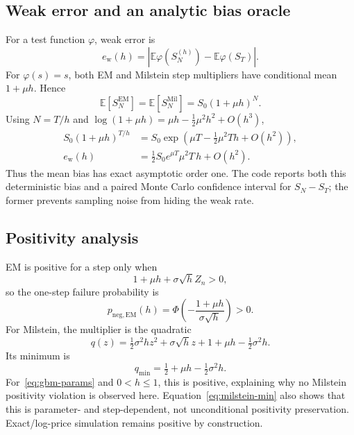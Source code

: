 \documentclass[11pt,a4paper]{article}
\theoremstyle{definition}
\theoremstyle{remark}
\begin{document}
\subsection{Weak error and an analytic bias oracle}
For a test function $\varphi$, weak error is
\begin{equation}
 e_{\mathrm{w}}(h)=\left|\mathbb E\varphi(S_N^{(h)})-
 \mathbb E\varphi(S_T)\right|.
 \label{eq:weak-def}
\end{equation}
For $\varphi(s)=s$, both EM and Milstein step multipliers have conditional mean
$1+\mu h$.  Hence
\begin{equation}
 \mathbb E[S_N^{\mathrm{EM}}]
 =\mathbb E[S_N^{\mathrm{Mil}}]
 =S_0(1+\mu h)^N.
 \label{eq:numerical-mean}
\end{equation}
Using $N=T/h$ and $\log(1+\mu h)=\mu h-\tfrac12\mu^2h^2+O(h^3)$,
\begin{align}
 S_0(1+\mu h)^{T/h}
 &=S_0\exp\!\left(\mu T-\tfrac12\mu^2Th+O(h^2)\right),\\
 e_{\mathrm w}(h)
 &=\tfrac12S_0e^{\mu T}\mu^2T\,h+O(h^2).
 \label{eq:weak-expansion}
\end{align}
Thus the mean bias has exact asymptotic order one.  The code reports both this
deterministic bias and a paired Monte Carlo confidence interval for
$S_N-S_T$; the former prevents sampling noise from hiding the weak rate.

\subsection{Positivity analysis}
EM is positive for a step only when
\begin{equation}
 1+\mu h+\sigma\sqrt h Z_n>0,
\end{equation}
so the one-step failure probability is
\begin{equation}
 p_{\mathrm{neg,EM}}(h)
 =\Phi\!\left(-\frac{1+\mu h}{\sigma\sqrt h}\right)>0.
 \label{eq:em-neg-prob}
\end{equation}
For Milstein, the multiplier is the quadratic
\begin{equation}
 q(z)=\tfrac12\sigma^2hz^2+\sigma\sqrt h z
 +1+\mu h-\tfrac12\sigma^2h.
 \label{eq:milstein-quadratic}
\end{equation}
Its minimum is
\begin{equation}
 q_{\min}=\tfrac12+\mu h-\tfrac12\sigma^2h.
 \label{eq:milstein-min}
\end{equation}
For~\eqref{eq:gbm-params} and $0<h\le1$, this is positive, explaining why no
Milstein positivity violation is observed here.  Equation~\eqref{eq:milstein-min}
also shows that this is parameter- and step-dependent, not unconditional
positivity preservation.  Exact/log-price simulation remains positive by
construction.
\end{document}
